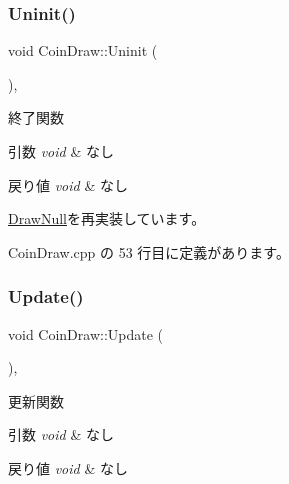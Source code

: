 \subsubsection{\texorpdfstring{Uninit()}{Uninit()}}
{\footnotesize\ttfamily void Coin\+Draw\+::\+Uninit (\begin{DoxyParamCaption}{ }\end{DoxyParamCaption})\hspace{0.3cm}{\ttfamily [override]}, {\ttfamily [virtual]}}



終了関数 


\begin{DoxyParams}{引数}
{\em void} & なし \\
\hline
\end{DoxyParams}

\begin{DoxyRetVals}{戻り値}
{\em void} & なし \\
\hline
\end{DoxyRetVals}


\mbox{\hyperlink{class_draw_null_a12d44e341c7364b5ab9cdd661dc16187}{Draw\+Null}}を再実装しています。



 Coin\+Draw.\+cpp の 53 行目に定義があります。

\mbox{\label{class_coin_draw_a6157b17bf1706b85156aad0d88acfd7e}} 
\subsubsection{\texorpdfstring{Update()}{Update()}}
{\footnotesize\ttfamily void Coin\+Draw\+::\+Update (\begin{DoxyParamCaption}{ }\end{DoxyParamCaption})\hspace{0.3cm}{\ttfamily [override]}, {\ttfamily [virtual]}}



更新関数 


\begin{DoxyParams}{引数}
{\em void} & なし \\
\hline
\end{DoxyParams}

\begin{DoxyRetVals}{戻り値}
{\em void} & なし \\
\hline
\end{DoxyRetVals}


